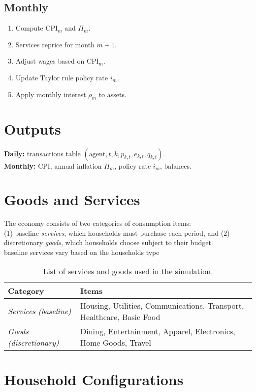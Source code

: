 \documentclass[12pt]{article}
\begin{document}
\subsection*{Monthly}
\begin{enumerate}
\item Compute CPI$_m$ and $\Pi_m$.
\item Services reprice for month $m+1$.
\item Adjust wages based on CPI$_m$.
\item Update Taylor rule policy rate $i_m$.
\item Apply monthly interest $\rho_m$ to assets.
\end{enumerate}

\section{Outputs}
\textbf{Daily:} transactions table $(\text{agent},t,k,p_{k,t},e_{k,t},q_{k,t})$.  \\
\textbf{Monthly:} CPI, annual inflation $\Pi_m$, policy rate $i_m$, balances.

\section{Goods and Services}

The economy consists of two categories of consumption items: \\
(1) baseline \emph{services}, which households must purchase each period, and (2) discretionary \emph{goods}, which households choose subject to their budget.  \\
baseline services vary based on the households type

\begin{table}[!ht]
\centering
\begin{tabular}{ll}
\toprule
\textbf{Category} & \textbf{Items} \\
\midrule
\emph{Services (baseline)} & Housing, Utilities, Communications, Transport, Healthcare, Basic Food \\
\emph{Goods (discretionary)} & Dining, Entertainment, Apparel, Electronics, Home Goods, Travel \\
\bottomrule
\end{tabular}
\caption{List of services and goods used in the simulation.}
\end{table}

\section{Household Configurations}
\end{document}
